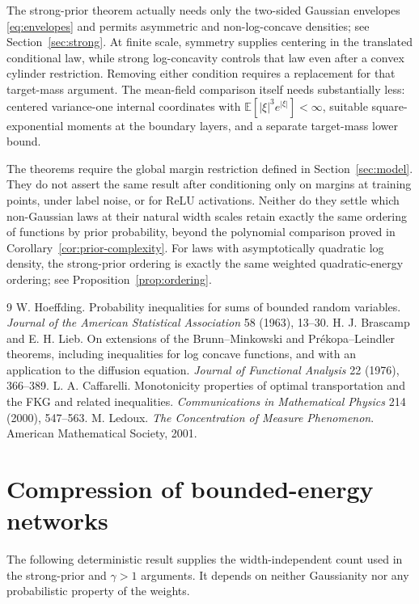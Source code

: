\documentclass[11pt]{article}
\theoremstyle{remark}\newtheorem{remark}[theorem]{Remark}
\newcommand{\E}{\mathbb E}\newcommand{\Prb}{\mathbb P}\renewcommand{\Pr}{\mathbb P}\newcommand{\R}{\mathbb R}
\begin{document}
The strong-prior theorem actually needs only the two-sided Gaussian
envelopes \eqref{eq:envelopes} and permits asymmetric and non-log-concave
densities; see
Section~\ref{sec:strong}. At finite scale, symmetry supplies centering in
the translated conditional law, while strong log-concavity controls that
law even after a convex cylinder restriction. Removing either condition
requires a replacement for that target-mass argument. The mean-field
comparison itself needs substantially less: centered variance-one internal
coordinates with $\E[|\xi|^3e^{|\xi|}]<\infty$, suitable square-exponential
moments at the boundary layers, and a separate target-mass lower bound.

The theorems require the global margin restriction defined in
Section~\ref{sec:model}. They do not
assert the same result after conditioning only on margins at training
points, under label noise, or for ReLU activations. Neither do they settle
which non-Gaussian laws at their natural width scales retain exactly the
same ordering of functions by prior probability, beyond the polynomial
comparison proved in Corollary~\ref{cor:prior-complexity}. For laws with asymptotically
quadratic log density, the strong-prior ordering is exactly the same
weighted quadratic-energy ordering; see Proposition~\ref{prop:ordering}.

\begingroup
\small
\begin{thebibliography}{9}
\setlength{\itemsep}{2pt}
 W. Hoeffding.
Probability inequalities for sums of bounded random variables.
\emph{Journal of the American Statistical Association} 58 (1963), 13--30.
 H. J. Brascamp and E. H. Lieb.
On extensions of the Brunn--Minkowski and Pr\'ekopa--Leindler theorems,
including inequalities for log concave functions, and with an application
to the diffusion equation. \emph{Journal of Functional Analysis} 22
(1976), 366--389.
 L. A. Caffarelli.
Monotonicity properties of optimal transportation and the FKG and related
inequalities. \emph{Communications in Mathematical Physics} 214 (2000),
547--563.
 M. Ledoux.
\emph{The Concentration of Measure Phenomenon}.
American Mathematical Society, 2001.
\end{thebibliography}
\endgroup

\appendix
\section{Compression of bounded-energy networks}\label{sec:norm-appendix}
The following deterministic result supplies the width-independent count
used in the strong-prior and $\gamma>1$ arguments. It depends on neither
Gaussianity nor any probabilistic property of the weights.



\end{document}
